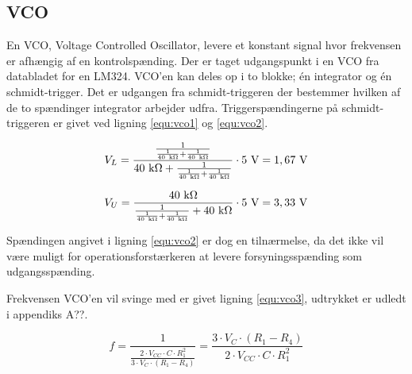 \subsection*{VCO}
\label{volumenkontrol-vco}

En VCO, Voltage Controlled Oscillator, levere et konstant signal hvor frekvensen er afhængig af en kontrolspænding. Der er taget udgangspunkt i en VCO fra databladet for en LM324. VCO'en kan deles op i to blokke; én integrator og én schmidt-trigger. Det er udgangen fra schmidt-triggeren der bestemmer hvilken af de to spændinger integrator arbejder udfra. Triggerspændingerne på schmidt-triggeren er givet ved ligning \ref{equ:vco1} og \ref{equ:vco2}.

\begin{equation}
\label{equ:vco1}
V_L = \mathrm{\frac{\frac{1}{\frac{1}{40~k\ohm} + \frac{1}{40~k\ohm}}}{40~k\ohm + \frac{1}{\frac{1}{40~k\ohm} + \frac{1}{40~k\ohm}}} \cdot 5~V = 1,67~V}
\end{equation}

\begin{equation}
\label{equ:vco2}
V_U = \mathrm{\frac{40~k\ohm}{\frac{1}{\frac{1}{40~k\ohm} + \frac{1}{40~k\ohm}} + 40~k\ohm} \cdot 5~V = 3,33~V}
\end{equation}

Spændingen angivet i ligning \ref{equ:vco2} er dog en tilnærmelse, da det ikke vil være muligt for operationsforstærkeren at levere forsyningsspænding som udgangsspænding.

Frekvensen VCO'en vil svinge med er givet ligning \ref{equ:vco3}, udtrykket er udledt i appendiks A??.

\begin{equation}
\label{equ:vco3}
f = \frac{1}{\frac{2 \cdot V_{CC} \cdot C \cdot R_1^2}{3 \cdot V_C \cdot (R_1 - R_4)}} = \frac{3 \cdot V_C \cdot (R_1 - R_4)}{2 \cdot V_{CC} \cdot C \cdot R_1^2}
\end{equation}